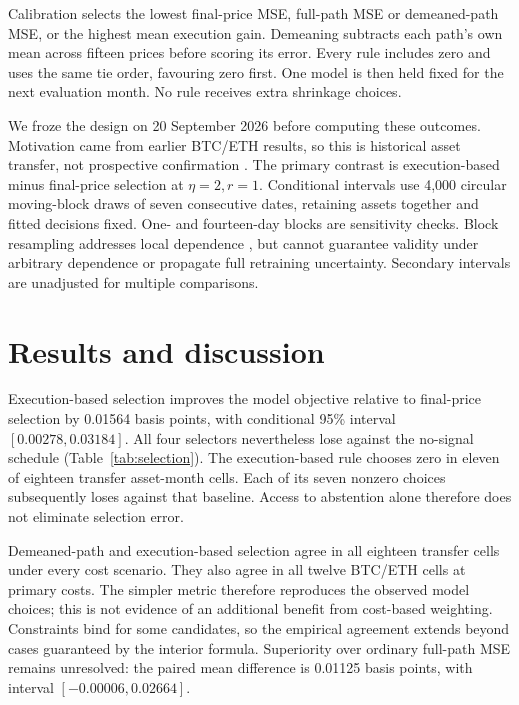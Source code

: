 \documentclass[11pt]{article}
\begin{document}
Calibration selects the lowest final-price MSE, full-path MSE or demeaned-path MSE, or the highest mean execution gain. Demeaning subtracts each path's own mean across fifteen prices before scoring its error. Every rule includes zero and uses the same tie order, favouring zero first. One model is then held fixed for the next evaluation month. No rule receives extra shrinkage choices.

We froze the design on 20 September 2026 before computing these outcomes. Motivation came from earlier BTC/ETH results, so this is historical asset transfer, not prospective confirmation \citep{arnott2019}. The primary contrast is execution-based minus final-price selection at $\eta=2,r=1$. Conditional intervals use 4,000 circular moving-block draws of seven consecutive dates, retaining assets together and fitted decisions fixed. One- and fourteen-day blocks are sensitivity checks. Block resampling addresses local dependence \citep{politis1994}, but cannot guarantee validity under arbitrary dependence or propagate full retraining uncertainty. Secondary intervals are unadjusted for multiple comparisons.

\section{Results and discussion}
Execution-based selection improves the model objective relative to final-price selection by 0.01564 basis points, with conditional 95\% interval $[0.00278,0.03184]$. All four selectors nevertheless lose against the no-signal schedule (Table~\ref{tab:selection}). The execution-based rule chooses zero in eleven of eighteen transfer asset-month cells. Each of its seven nonzero choices subsequently loses against that baseline. Access to abstention alone therefore does not eliminate selection error.

\begin{table}[htbp]\centering\small
\caption{Primary transfer outcomes relative to the no-signal schedule, in basis points. Intervals condition on fitted forecasts and selections.}
\label{tab:selection}
\resizebox{\linewidth}{!}{}
\end{table}

Demeaned-path and execution-based selection agree in all eighteen transfer cells under every cost scenario. They also agree in all twelve BTC/ETH cells at primary costs. The simpler metric therefore reproduces the observed model choices; this is not evidence of an additional benefit from cost-based weighting. Constraints bind for some candidates, so the empirical agreement extends beyond cases guaranteed by the interior formula. Superiority over ordinary full-path MSE remains unresolved: the paired mean difference is 0.01125 basis points, with interval $[-0.00006,0.02664]$.
\end{document}
